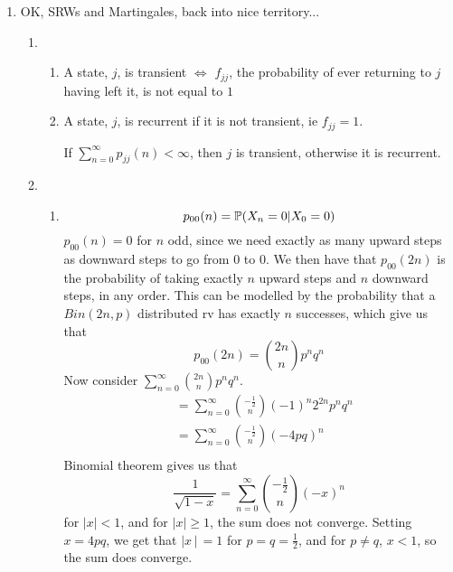\documentclass{article}
\begin{document}
\begin{enumerate}
\item OK, SRWs and Martingales, back into nice territory...
\begin{enumerate}
\item
\begin{enumerate}
\item A state, $j$, is transient $\iff$ $f_{jj}$, the probability of ever returning to $j$ having left it, is not equal to $1$
\item A state, $j$, is recurrent if it is not transient, ie $f_{jj}=1$.

If $\sum\limits^\infty_{n=0}p_{jj}(n) < \infty$, then $j$ is transient, otherwise it is recurrent.

\end{enumerate}
\item
\begin{enumerate}
\item
$$
p_{00}(n) = \mathbb{P} (X_n = 0 | X_0 = 0)
$$
$p_{00}(n) = 0$ for $n$ odd, since we need exactly as many upward steps as downward steps to go from $0$ to $0$. We then have that $p_{00}(2n)$ is the probability of taking exactly $n$ upward steps and $n$ downward steps, in any order. This can be modelled by the probability that a $Bin(2n,p)$ distributed rv has exactly $n$ successes, which give us that
$$
p_{00}(2n) = {2n \choose n} p^nq^n
$$
Now consider $\sum\limits^\infty_{n=0}{2n\choose n} p^nq^n$.
\begin{align*}
&= \sum^\infty_{n=0}{-\frac{1}{2}\choose n}(-1)^n 2^{2n} p^n q^n\\
&= \sum^\infty_{n=0}{-\frac{1}{2}\choose n}(-4pq)^n\\
\end{align*}
Binomial theorem gives us that
$$
\frac{1}{\sqrt{1-x}} = \sum^\infty_{n=0}{-\frac{1}{2}\choose n}(-x)^n 
$$
for $|x|<1$, and for $|x|\geqslant 1$, the sum does not converge. Setting $x=4pq$, we get that $|x\!\,|\,=1$ for $p=q=\frac{1}{2}$, and for $p \neq q$, $x<1$, so the sum does converge.


\end{enumerate}
\end{enumerate}
\end{enumerate}
\end{document}

